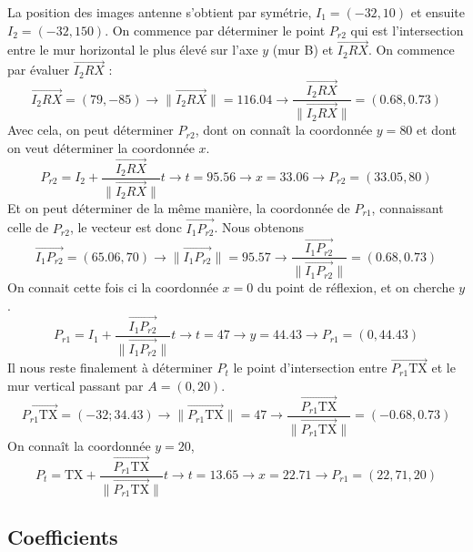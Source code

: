 La position des images antenne s'obtient par symétrie, $I_1 = (- 32, 10)$ et
ensuite $I_2 = (- 32, 150)$.
On commence par d{\'e}terminer le point $P_{r 2}$ qui est l'intersection entre
le mur horizontal le plus élevé sur l'axe $y$ (mur B) et $\overrightarrow{I_2 R
X}$. On commence par {\'e}valuer $\overrightarrow{I_2 R X}$ :
\[ \overrightarrow{I_2 R X} = (79, - 85) \rightarrow \| \overrightarrow{I_2 R
   X} \| = 116.04 \rightarrow \frac{\overrightarrow{I_2 R X}}{\|
   \overrightarrow{I_2 R X} \|} = (0.68, 0.73) \]
Avec cela, on peut d{\'e}terminer $P_{r 2}$, dont on conna{\^i}t la
coordonn{\'e}e $y = 80$ et dont on veut d{\'e}terminer la coordonn{\'e}e $x$.
\[ P_{r 2} = I_2 + \frac{\overrightarrow{I_2 R X}}{\| \overrightarrow{I_2 R X}
   \|} t \rightarrow t = 95.56 \rightarrow x = 33.06 \rightarrow P_{r 2} =
   (33.05, 80) \]
Et on peut d{\'e}terminer de la m{\^e}me mani{\`e}re, la coordonn{\'e}e de
$P_{r 1}$, connaissant celle de $P_{r 2}$, le vecteur est donc
$\overrightarrow{I_1 P_{r 2}}$. Nous obtenons
\[ \overrightarrow{I_1 P_{r 2}} = (65.06, 70) \rightarrow \|
   \overrightarrow{I_1 P_{r 2}} \| = 95.57 \rightarrow
   \frac{\overrightarrow{I_1 P_{r 2}}}{\| \overrightarrow{I_1 P_{r 2}} \|} =
   (0.68, 0.73) \]
On connait cette fois ci la coordonn{\'e}e $x = 0$ du point de r{\'e}flexion,
et on cherche $y$.
\[ P_{r 1} = I_1 + \frac{\overrightarrow{I_1 P_{r 2}}}{\| \overrightarrow{I_1
   P_{r 2}} \|} t \rightarrow t = 47 \rightarrow y = 44.43 \rightarrow P_{r 1}
   = (0, 44.43) \]
Il nous reste finalement {\`a} d{\'e}terminer $P_t$ le point d'intersection
entre $\overrightarrow{P_{r 1} \mathrm{TX}}$ et le mur vertical passant par $A =
(0, 20)$.
\[ \overrightarrow{P_{r 1} \mathrm{TX}} = (- 32 ; 34.43) \rightarrow \|
   \overrightarrow{P_{r 1} \mathrm{TX}} \| = 47 \rightarrow
   \frac{\overrightarrow{P_{r 1} \mathrm{TX}}}{\| \overrightarrow{P_{r 1}
   \mathrm{TX}} \|} = (- 0.68, 0.73) \]
On conna{\^i}t la coordonn{\'e}e $y = 20$,
\[ P_t = \mathrm{TX} + \frac{\overrightarrow{P_{r 1} \mathrm{TX}}}{\|
   \overrightarrow{P_{r 1} \mathrm{TX}} \|} t \rightarrow t = 13.65 \rightarrow
   x = 22.71 \rightarrow P_{r 1} = (22, 71, 20) \]

\subsection{Coefficients}

